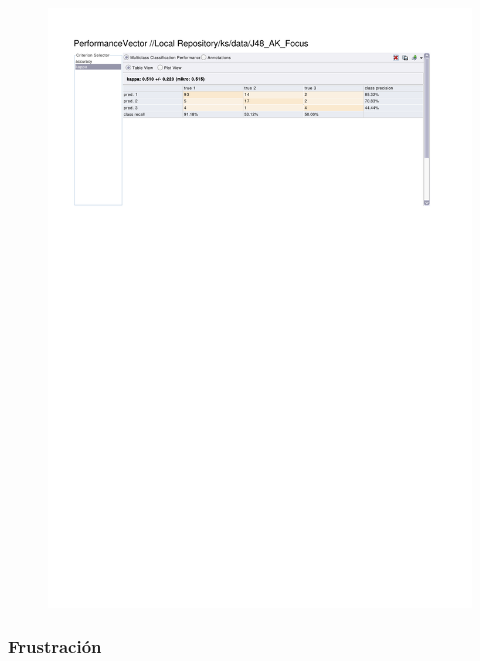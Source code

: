 \begin{figure}[htp]
  \centerline{\includegraphics[trim=0 683 0 60,clip,width=16.09cm]{results/J48_K_Focus.pdf}} \caption{
} \label{J48_K_Focus}
\end{figure}

\clearpage
\FloatBarrier
\subsubsection{Frustración}

